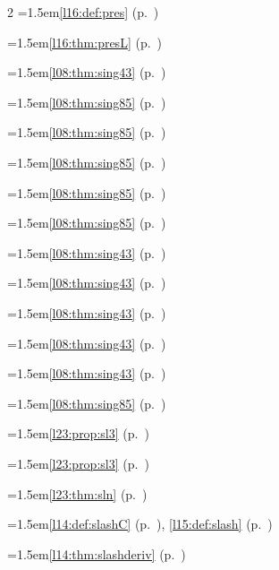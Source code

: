 \begin{multicols}{2}
\hangindent=1.5em\quad \ref{l16:def:pres} (p.~\pageref{l16:def:pres})\par
\hangindent=1.5em\quad \ref{l16:thm:presL} (p.~\pageref{l16:thm:presL})\par
\hangindent=1.5em\quad \ref{l08:thm:sing43} (p.~\pageref{l08:thm:sing43})\par
\hangindent=1.5em\quad \ref{l08:thm:sing85} (p.~\pageref{l08:thm:sing85})\par
\hangindent=1.5em\quad \ref{l08:thm:sing85} (p.~\pageref{l08:thm:sing85})\par
\hangindent=1.5em\quad \ref{l08:thm:sing85} (p.~\pageref{l08:thm:sing85})\par
\hangindent=1.5em\quad \ref{l08:thm:sing85} (p.~\pageref{l08:thm:sing85})\par
\hangindent=1.5em\quad \ref{l08:thm:sing85} (p.~\pageref{l08:thm:sing85})\par
\hangindent=1.5em\quad \ref{l08:thm:sing43} (p.~\pageref{l08:thm:sing43})\par
\hangindent=1.5em\quad \ref{l08:thm:sing43} (p.~\pageref{l08:thm:sing43})\par
\hangindent=1.5em\quad \ref{l08:thm:sing43} (p.~\pageref{l08:thm:sing43})\par
\hangindent=1.5em\quad \ref{l08:thm:sing43} (p.~\pageref{l08:thm:sing43})\par
\hangindent=1.5em\quad \ref{l08:thm:sing43} (p.~\pageref{l08:thm:sing43})\par
\hangindent=1.5em\quad \ref{l08:thm:sing85} (p.~\pageref{l08:thm:sing85})\par
\hangindent=1.5em\quad \ref{l23:prop:sl3} (p.~\pageref{l23:prop:sl3})\par
\hangindent=1.5em\quad \ref{l23:prop:sl3} (p.~\pageref{l23:prop:sl3})\par
\hangindent=1.5em\quad \ref{l23:thm:sln} (p.~\pageref{l23:thm:sln})\par
\hangindent=1.5em\quad \ref{l14:def:slashC} (p.~\pageref{l14:def:slashC}), \ref{l15:def:slash} (p.~\pageref{l15:def:slash})\par
\hangindent=1.5em\quad \ref{l14:thm:slashderiv} (p.~\pageref{l14:thm:slashderiv})\par

\end{multicols}

